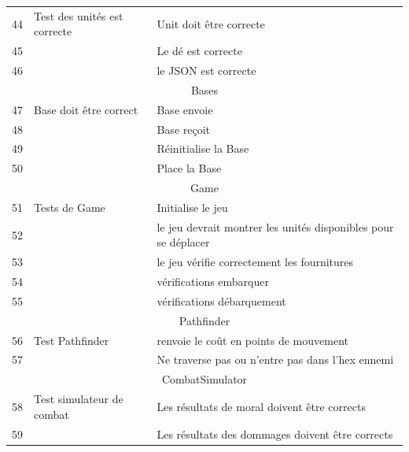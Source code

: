 \begin{center}
\begin{tabular}{|l|l|l|}
     44 & Test des unités est correcte & Unit doit être correcte \\
     45 && Le dé est correcte \\  
     46 && le JSON est correcte \\
 
     \hline 
     \multicolumn{3}{c}{Bases}\\
     \hline
 
     47 & Base doit être correct & Base envoie \\
     48 && Base reçoit \\
     49 && Réinitialise la Base \\
     50 && Place la Base\\

     \hline
    \multicolumn{3}{c}{Game}\\
    \hline
    51 & Tests de Game &  Initialise le jeu \\
    52 && le jeu devrait montrer les unités disponibles pour se déplacer\\
    53 && le jeu vérifie correctement les fournitures \\
    54 && vérifications embarquer \\
    55 && vérifications débarquement \\
    \hline
    \multicolumn{3}{c}{Pathfinder}\\
    \hline
    56 & Test Pathfinder  & renvoie le coût en points de mouvement\\ %
    57 && Ne traverse pas ou n'entre pas dans l'hex ennemi \\
    \hline
    \multicolumn{3}{c}{CombatSimulator}\\
    \hline
    58 & Test  simulateur de combat  & Les résultats de moral doivent être corrects \\
    59 && Les résultats des dommages doivent être corrects \\
     \hline
     
 

\end{tabular}
\end{center}
